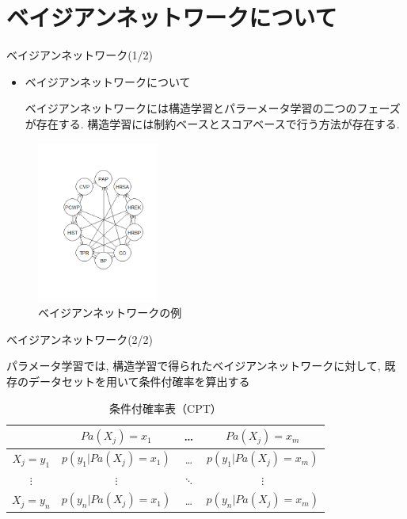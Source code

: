\documentclass[dvipdfmx]{beamer}
\begin{document}
\section{ベイジアンネットワークについて}
\begin{frame}{ベイジアンネットワーク(1/2)}
\begin{itemize} 
\item{ベイジアンネットワークについて}
\vspace{0.3cm}

ベイジアンネットワークには構造学習とパラーメータ学習の二つのフェーズが存在する. 構造学習には制約ベースとスコアベースで行う方法が存在する. 

\end{itemize}
\vspace{-0.5cm}
\begin{figure}[H]
 \begin{center}
  \includegraphics[width=40mm]{data/BN4.png}
 \end{center}
 \caption{ベイジアンネットワークの例}
 \label{naive}
\end{figure}

\end{frame}

\begin{frame}{ベイジアンネットワーク(2/2)}

パラメータ学習では, 構造学習で得られたベイジアンネットワークに対して, 既存のデータセットを用いて条件付確率を算出する

\begin{table}[H]
\begin{center}
\caption{条件付確率表（CPT）}   %
\label{cpt}   %
\begin{tabular}{|c||c|c|c|}   %
\hline
 & $Pa(X_{j})=x_{1}$ & \dots & $Pa(X_{j})=x_{m}$
\\ \hline
$X_j=y_1$ & $p(y_1|Pa(X_j)=x_1)$ & \dots & $p(y_1|Pa(X_j)=x_m)$
\\ \hline
$\vdots$ & $\vdots$ & $\ddots$ & $\vdots$
\\ \hline
$X_j=y_n$ & $ p(y_n|Pa(X_j)=x_1)$ & \dots & $p(y_n|Pa(X_j)=x_m)$
\\ \hline
\end{tabular}
\end{center}
\end{table}

\end{frame}
\end{document}

